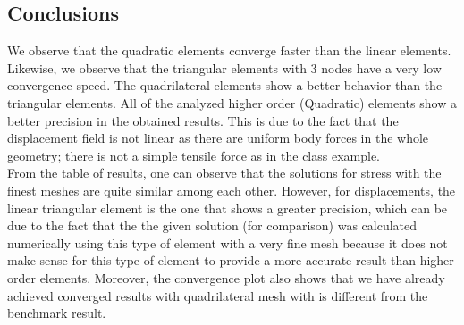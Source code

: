 \documentclass[a4paper,12pt,twoside,english]{article}
\begin{document}
\subsection{Conclusions}
We observe that the quadratic elements converge faster than the linear elements. Likewise, we observe that the triangular elements with 3 nodes have a very low convergence speed. The quadrilateral elements show a better behavior than the triangular elements.
All of the analyzed higher order (Quadratic) elements   show a better precision in the obtained results. This is due to the fact that the displacement field is not linear as there are uniform body forces in the whole geometry; there is not a simple tensile force as in the class example.\\
From the table of results, one can observe that the solutions for stress with the finest meshes are quite similar among each other. However, for displacements, the linear triangular element is the one that shows a greater precision, which can be due to the fact that the the given solution (for comparison) was calculated numerically using this type of element with a very fine mesh because it does not make sense for this type of element to provide a more accurate result than higher order elements. Moreover, the convergence plot also shows that we have already achieved converged results with quadrilateral mesh with is different from the benchmark result.
\end{document}
